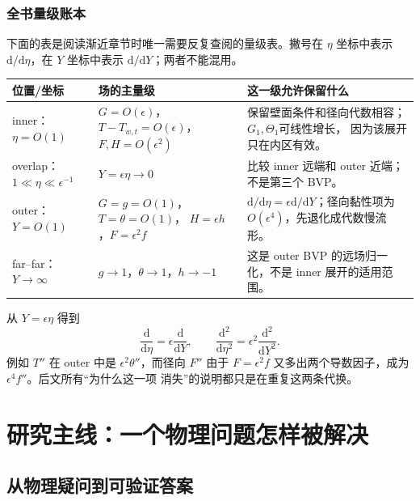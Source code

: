 \documentclass[UTF8,zihao=-4,openany]{ctexbook}
\newcommand{\eps}{\epsilon}
\newcommand{\dd}{\mathrm{d}}
\begin{document}
\section*{全书量级账本}
下面的表是阅读渐近章节时唯一需要反复查阅的量级表。撇号在 $\eta$ 坐标中表示
$\dd/\dd\eta$，在 $Y$ 坐标中表示 $\dd/\dd Y$；两者不能混用。

\begin{center}
\begin{tabular}{p{}p{}p{}}
\toprule
位置/坐标 & 场的主量级 & 这一级允许保留什么 \\
\midrule
inner：$\eta=O(1)$ & $G=O(\eps)$，$T-T_{w,t}=O(\eps)$，
$F,H=O(\eps^2)$ & 保留壁面条件和径向代数相容；$G_1,\Theta_1$可线性增长，
因为该展开只在内区有效。 \\
overlap：$1\ll\eta\ll\eps^{-1}$ & $Y=\eps\eta\to0$ & 比较 inner 远端和
outer 近端；不是第三个 BVP。 \\
outer：$Y=O(1)$ & $G=g=O(1)$，$T=\theta=O(1)$，
$H=\eps h$，$F=\eps^2 f$ & $\dd/\dd\eta=\eps\dd/\dd Y$；径向黏性项为
$O(\eps^4)$，先退化成代数慢流形。 \\
far--far：$Y\to\infty$ & $g\to1$，$\theta\to1$，$h\to-1$ & 这是 outer
BVP 的远场归一化，不是 inner 展开的适用范围。 \\
\bottomrule
\end{tabular}
\end{center}

\begin{keyresult}[：每次换坐标都要同时换导数]
从 $Y=\eps\eta$ 得到
\begin{equation*}
 \frac{\dd}{\dd\eta}=\eps\frac{\dd}{\dd Y},\qquad
 \frac{\dd^2}{\dd\eta^2}=\eps^2\frac{\dd^2}{\dd Y^2}.
\end{equation*}
例如 $T''$ 在 outer 中是 $\eps^2\theta''$，而径向 $F''$ 由于
$F=\eps^2f$ 又多出两个导数因子，成为 $\eps^4f''$。后文所有“为什么这一项
消失”的说明都只是在重复这两条代换。
\end{keyresult}

\tableofcontents
\mainmatter

\part{研究主线：一个物理问题怎样被解决}

\chapter{从物理疑问到可验证答案}\label{ch:mainline}
\end{document}
